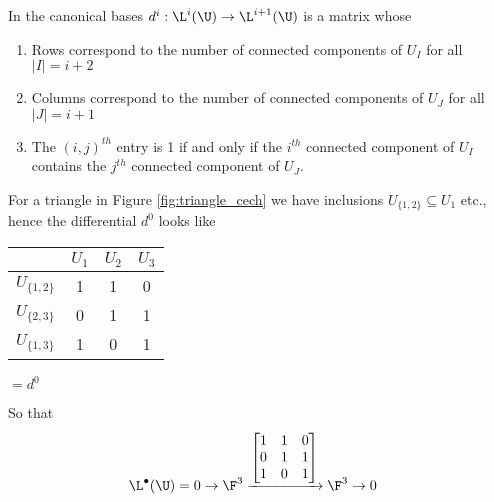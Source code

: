 \noindent In the canonical bases $d^i: \L^i(\U) \rightarrow \L^{i+1}(\U)$ is a matrix whose
\begin{enumerate}
  \item Rows correspond to the number of connected components of $U_I$ for all $|I|=i+2$
  \item Columns correspond to the number of connected components of $U_J$ for all $|J| = i+1$
  \item The $(i,j)^{th}$ entry is 1 if and only if the $i^{th}$ connected component of $U_I$ contains the $j^{th}$ connected component of $U_J$.
\end{enumerate}
\begin{example}
  \label{ex:triangle_cech}
	For a triangle in Figure \ref{fig:triangle_cech} we have inclusions $U_{\{1,2\}} \subseteq U_1$ etc., hence the differential $d^0$ looks like
	\begin{center}
		\begin{tabular}{ l | c c c  }
			& $U_1$ & $U_2$ & $U_3$ \\\hline
			$U_{\{1,2\}}$ & 1 & 1 & 0 \\
			$U_{\{2,3\}}$ & 0 & 1 & 1 \\
			$U_{\{1,3\}}$ & 1 & 0 & 1
		\end{tabular} $ = d^0$
	\end{center}
  So that
    \begin{align*}
  		\L^\bullet(\U)
      &=
      0 \rightarrow \F^3 \xrightarrow{\begin{bmatrix}1 & 1 & 0 \\0 & 1 & 1 \\ 1 & 0 & 1 \end{bmatrix}} \F^3 \rightarrow 0
  	\end{align*}
  \end{example}

